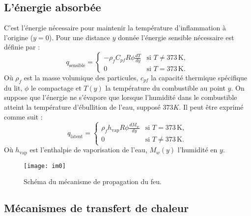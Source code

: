 \documentclass[12pt, oneside]{report} %
\theoremstyle{definition}
\theoremstyle{remark}
\begin{document}
		\subsection*{L'énergie absorbée}
		C'est l'énergie nécessaire pour maintenir la température d'inflammation à l'origine ($y = 0$). Pour une distance $y$ donnée l'énergie sensible nécessaire est définie par : 
		\begin{equation}
			q_{\text{sensible}} = \begin{cases}
				-\rho_f C_{pf}R \phi\frac{d T}{d y} & \text{si } T \neq 373\,\mathrm{K}, \\
				0  & \text{si } T = 373\,\mathrm{K}.
			\end{cases}
		\end{equation}
		Où $\rho_f$ est la masse volumique des particules, $ c_{pf}$ la capacité thermique spécifique du lit, $\phi$ le compactage  %
		et $T(y)$ la température du combustible au point $y$. On suppose que l'énergie ne s'évapore que lorsque l'humidité dans le combustible atteint la température d'ébullition de l'eau, supposé $373K$. Il peut être exprimé comme suit :   
		\begin{equation}
			q_{\text{latent}} = \begin{cases}
				\rho_f h_{\text{vap}} R \phi\frac{d M_w}{d y} & \text{si } T = 373\,\mathrm{K}, \\
				0 & \text{si } T \neq 373\,\mathrm{K}.
			\end{cases}
		\end{equation}
		Où $h_{\text{vap}}$ est l'enthalpie de vaporisation de l'eau, $M_w(y)$ l'humidité en $y$. %
		
				
		\clearpage
		\begin{landscape}
			\begin{figure}
				\centering
				\texttt{[image: im0]}
				\caption{Schéma du mécanisme de propagation du feu.}
				\label{fig:im0}
			\end{figure}
		\end{landscape}
		\clearpage
		
		
		\subsection{Mécanismes de transfert de chaleur}
\end{document}

